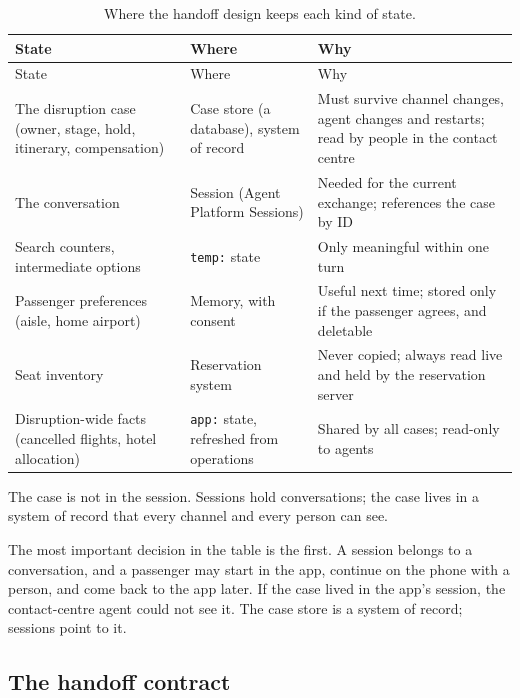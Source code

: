 \begingroup
\small
\begin{xltabular}{\textwidth}{@{}>{\raggedright\arraybackslash}p{3.3cm}>{\raggedright\arraybackslash}p{3.4cm}>{\raggedright\arraybackslash}X@{}}
\caption{Where the handoff design keeps each kind of state.}\label{tab:air-state}\\
\toprule
{} State & Where & Why \\
\midrule
\endfirsthead
\toprule
{} State & Where & Why \\
\midrule
\endhead
The disruption case (owner, stage, hold, itinerary, compensation) & Case store (a database), system of record & Must survive channel changes, agent changes and restarts; read by people in the contact centre \\
The conversation & Session (Agent Platform Sessions) & Needed for the current exchange; references the case by ID \\
Search counters, intermediate options & \texttt{temp:} state & Only meaningful within one turn \\
Passenger preferences (aisle, home airport) & Memory, with consent & Useful next time; stored only if the passenger agrees, and deletable \\
Seat inventory & Reservation system & Never copied; always read live and held by the reservation server \\
Disruption-wide facts (cancelled flights, hotel allocation) & \texttt{app:} state, refreshed from operations & Shared by all cases; read-only to agents \\
\bottomrule
\end{xltabular}
\endgroup

\begin{keyidea}
The case is not in the session. Sessions hold conversations; the case lives in a system of record that every channel and every person can see.
\end{keyidea}

The most important decision in the table is the first. A session belongs to a conversation, and a passenger may start in the app, continue on the phone with a person, and come back to the app later. If the case lived in the app's session, the contact-centre agent could not see it. The case store is a system of record; sessions point to it.

\subsection{The handoff contract}

